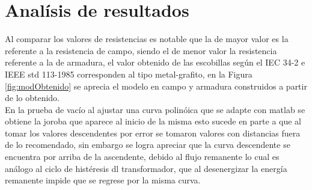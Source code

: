 \documentclass[11pt,letterpaper]{article}     %
\begin{document}
\section{Analísis de resultados}
Al comparar los valores de resistencias es notable que la de mayor valor es la referente a la resistencia de campo, siendo el de menor valor la resistencia referente a la de armadura, el valor obtenido de las escobillas según el IEC 34-2 e IEEE std 113-1985 corresponden al tipo metal-grafito, en la Figura \ref{fig:modObtenido} se aprecia el modelo en campo y armadura construidos a partir de lo obtenido.\\

En la prueba de vacío al ajustar una curva polinóica que se adapte con matlab se obtiene la joroba que aparece al inicio de la misma esto sucede en parte a que al tomar los valores descendentes por error se tomaron valores con distancias fuera de lo recomendado, sin embargo se logra apreciar que la curva descendente se encuentra por arriba de la ascendente, debido al flujo remanente lo cual es análogo al ciclo de histéresis dl transformador, que al desenergizar la energía remanente impide que se regrese por la misma curva.\\

    
\end{document}
